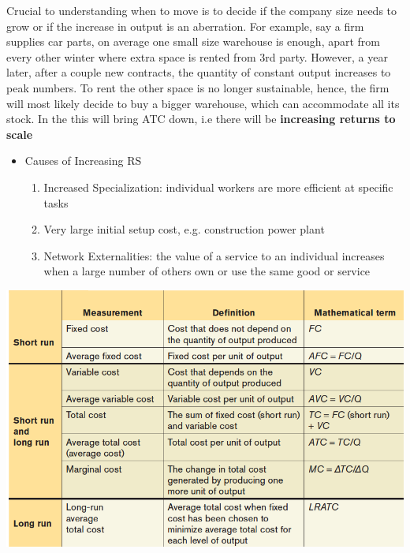 \documentclass[english,course,draft]{Notes}
\begin{document}
\par{Crucial to understanding when to move is to decide if the company size needs to grow or if the increase in output is an aberration. For example, say a firm supplies car parts, on average one small size warehouse is enough, apart from every other winter where extra space is rented from 3rd party. However, a year later, after a couple new contracts, the quantity of constant output increases to peak numbers. To rent the other space is no longer sustainable, hence, the firm will most likely decide to buy a bigger warehouse, which can accommodate all its stock. In the  this will bring ATC down, i.e there will be \textbf{increasing returns to scale}}



\begin{itemize}
	\item[] Causes of Increasing RS
	\begin{enumerate}
		\item Increased Specialization: individual workers are more efficient at specific tasks
		\item Very large initial setup cost, e.g. construction power plant
		\item Network Externalities: the value of a service to an individual increases when a large number of others own or use the same good or service
	\end{enumerate}
\end{itemize}


\includegraphics[width=\textwidth]{SummaryCosts}
\end{document}
